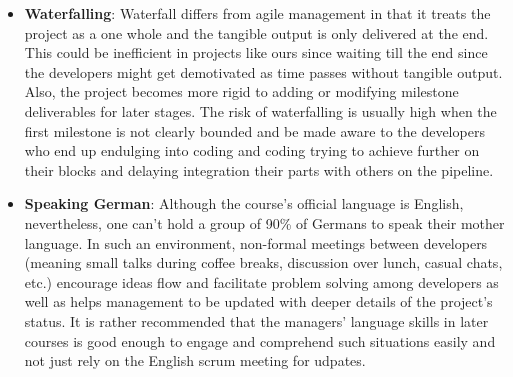 \begin{itemize}
\item \textbf{Waterfalling}: Waterfall differs from agile management in that it treats the project as a one whole and the tangible output is only delivered at the end. This could be inefficient in projects like ours since waiting till the end since the developers might get demotivated as time passes without tangible output. Also, the project becomes more rigid to adding or modifying milestone deliverables for later stages. The risk of waterfalling is usually high when the first milestone is not clearly bounded and be made aware to the developers who end up endulging into coding and coding trying to achieve further on their blocks and delaying integration their parts with others on the pipeline.
\item \textbf{Speaking German}: Although the course's official language is English, nevertheless, one can't hold a group of 90\% of Germans to speak their mother language. In such an environment, non-formal meetings between developers (meaning small talks during coffee breaks, discussion over lunch, casual chats, etc.) encourage ideas flow and facilitate problem solving among developers as well as helps management to be updated with deeper details of the project's status. It is rather recommended that the managers' language skills in later courses is good enough to engage and comprehend such situations easily and not just rely on the English scrum meeting for udpates.
\end{itemize}

